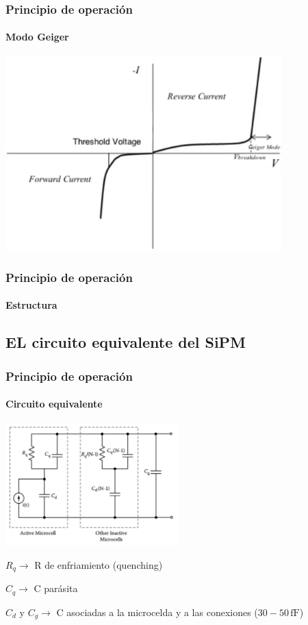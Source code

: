 \documentclass{beamer}
\begin{document}
\begin{frame}
\frametitle{Principio de operación}
\framesubtitle{Modo Geiger}
\begin{center}
\includegraphics[width=0.8\textwidth]{d1/curva_sipm}
\end{center}
\end{frame}

\begin{frame}
\frametitle{Principio de operación}
\framesubtitle{Estructura}
\begin{center}
\end{center}
\end{frame}

\subsection{EL circuito equivalente del SiPM}

\begin{frame}
\frametitle{Principio de operación}
\framesubtitle{Circuito equivalente}
\begin{center}
\includegraphics[width=0.5\textwidth]{d1/sipm_equiv_circ}
\end{center}

$R_q \rightarrow$ R de enfriamiento (quenching)

$C_q \rightarrow$ C parásita

$C_d\,\,\text{y}\,\,C_g \rightarrow$ C asociadas a la microcelda y a las
conexiones ($30-50\,\text{fF}$)
\end{frame}
\end{document}
